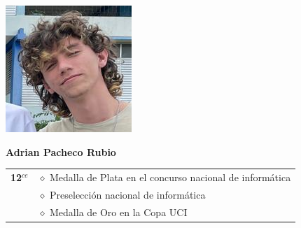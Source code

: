 \begin{minipage}{0.2\textwidth}
	\includegraphics[width=\linewidth]{img/concursantes/adrian.png} %
\end{minipage}
\hfill
\begin{minipage}{0.7\textwidth}
	\textbf{Adrian Pacheco Rubio}
	
	\vspace*{0.1in}
	\begin{tabular}{rl}
		
		
		\textbf{12$^{ce}$} 
		& $\diamond$ Medalla de Plata en el concurso nacional de informática \\
		& $\diamond$ Preselección nacional de informática  \\
		& $\diamond$ Medalla de Oro en la Copa UCI \\
		
		
	\end{tabular}
\end{minipage}

\vspace*{0.2in}


